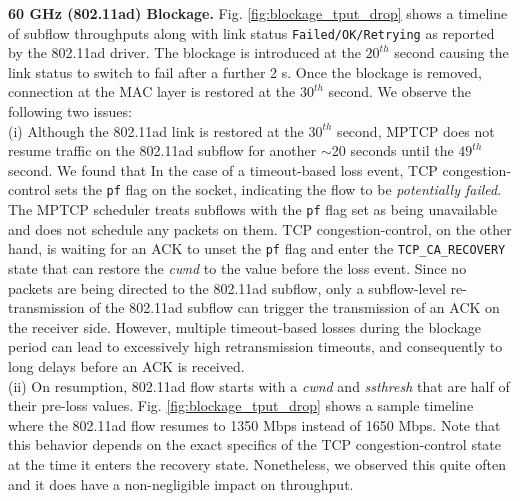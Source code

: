 \noindent\textbf{60 GHz (802.11ad) Blockage. } Fig. \ref{fig:blockage_tput_drop} shows a
timeline of subflow throughputs along with link status {\tt Failed/OK/Retrying} as reported by 
the 802.11ad driver. The blockage is introduced at the $20^{th}$ second causing the link status 
to switch to fail after a further 2 s. Once the blockage is removed, connection at the MAC layer is
restored at the $30^{th}$ second. We observe the following two issues:
\\
(i) Although the 802.11ad link is restored at the $30^{th}$ second, MPTCP does not resume traffic 
on the 802.11ad subflow for another $\sim$20 seconds until the $49^{th}$ second. We found that
In the case of a timeout-based loss event, TCP congestion-control sets the {\tt pf} flag on the socket,
indicating the flow to be \emph{potentially failed}. The MPTCP scheduler treats subflows with 
the {\tt pf} flag set as being unavailable and does not schedule any packets on them. TCP
congestion-control, on the other hand, is waiting for an ACK to unset
the {\tt pf} flag and enter the {\tt TCP\_CA\_RECOVERY} state that can
restore the \emph{cwnd} to the value before the loss event. Since no
packets are being directed to the 802.11ad subflow, only a subflow-level re-transmission 
of the 802.11ad subflow can trigger the transmission of an ACK on the receiver side. However, 
multiple timeout-based losses during the blockage period can lead to excessively 
high retransmission timeouts, and consequently to long delays before an ACK is received.
\\
(ii) On resumption, 802.11ad flow starts with a \emph{cwnd} and
\emph{ssthresh} that are half of their pre-loss values. Fig. \ref{fig:blockage_tput_drop} shows 
a sample timeline where the 802.11ad flow resumes to 1350 Mbps instead of 1650 Mbps. Note that
this behavior depends on the exact specifics of the TCP congestion-control state at the time 
it enters the recovery state. Nonetheless, we observed this quite often and it does have a
non-negligible impact on throughput.

